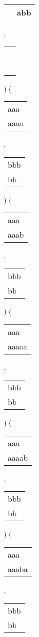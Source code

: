 \begin{description}
\begin{tabular}{|l|}
\ \ abb \\
\hline
\end{tabular} 
 , 
\begin{tabular}{|l|} \hline
\ \\ \ \\ \hline
\end{tabular} 
) 
 ( 
\begin{tabular}{|l|} \hline
aaa\  \\
aaaa \\
\hline
\end{tabular} 
 , 
\begin{tabular}{|l|} \hline
bbb \\
bb\  \\
\hline
\end{tabular} 
) 
 ( 
\begin{tabular}{|l|} \hline
aaa\  \\
aaab \\
\hline
\end{tabular} 
 , 
\begin{tabular}{|l|} \hline
bbb \\
bb\  \\
\hline
\end{tabular} 
) 
 ( 
\begin{tabular}{|l|} \hline
aaa\ \  \\
aaaaa \\
\hline
\end{tabular} 
 , 
\begin{tabular}{|l|} \hline
bbb \\
bb\  \\
\hline
\end{tabular} 
) 
 ( 
\begin{tabular}{|l|} \hline
aaa\ \  \\
aaaab \\
\hline
\end{tabular} 
 , 
\begin{tabular}{|l|} \hline
bbb \\
bb\  \\
\hline
\end{tabular} 
) 
 ( 
\begin{tabular}{|l|} \hline
aaa\ \  \\
aaaba \\
\hline
\end{tabular} 
 , 
\begin{tabular}{|l|} \hline
bbb \\
bb\  \\
\hline

\end{tabular}
\end{description}
